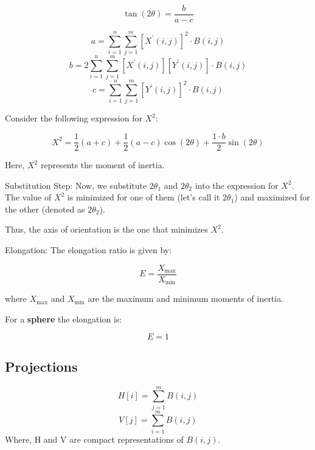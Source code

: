 \documentclass[11pt]{article}
\theoremstyle{definition}
\begin{document}
\[
\tan(2\theta) = \frac{b}{a-c}
\]
\newpage

\begin{shaded}
    \begin{equation}
        a = \sum_{i=1}^{n}\sum_{j=1}^{m}[X^\prime(i,j)]^2 \cdot B(i,j)
    \end{equation}
    \begin{equation}
        b = 2\sum_{i=1}^{n}\sum_{j=1}^{m}[X^\prime(i,j)][Y^\prime(i,j)] \cdot B(i,j)
    \end{equation}
    \begin{equation}
        c = \sum_{i=1}^{n}\sum_{j=1}^{m}[Y^\prime(i,j)]^2 \cdot B(i,j)
    \end{equation}
\end{shaded}
Consider the following expression for \( X^2 \):

\begin{equation}X^2 = \frac{1}{2}(a+c) + \frac{1}{2}(a-c) \cos(2\theta) + \frac{1\cdot b}{2} \sin(2\theta)\end{equation}

Here, \( X^2 \) represents the moment of inertia.

Substitution Step:
Now, we substitute \( 2\theta_1 \) and \( 2\theta_2 \) into the expression for \( X^2 \). The value of \( X^2 \) is minimized for one of them (let's call it \( 2\theta_1 \)) and maximized for the other (denoted as \( 2\theta_2 \)).

Thus, the axis of orientation is the one that minimizes \( X^2 \).

Elongation:
The elongation ratio is given by:

\[
E = \frac{X_{\text{max}}}{X_{\text{min}}}
\]

where \( X_{\text{max}} \) and \( X_{\text{min}} \) are the maximum and minimum moments of inertia.

For a \textbf{sphere} the elongation is:

\[
E = 1
\]

\subsection{Projections}
\begin{equation}
    H[i]  = \sum_{j=1}^{m} B(i, j) 
\end{equation}
\begin{equation}
    V[j]  = \sum_{i=1}^{m} B(i, j)
\end{equation}
Where, H and V are compact representations of $B(i,j)$.
\end{document}
